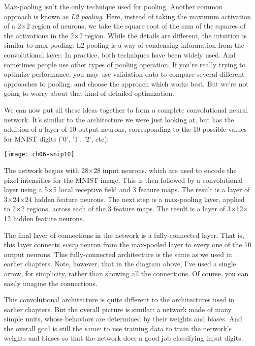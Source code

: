 Max-pooling isn't the only technique used for pooling. Another common approach is known as \textit{L2 pooling}. Here, instead of taking the maximum activation of a 2$\times$2 region of neurons, we take the square root of the sum of the squares of the activations in the 2$\times$2 region. While the details are different, the intuition is similar to max-pooling: L2 pooling is a way of condensing information from the convolutional layer. In practice, both techniques have been widely used. And sometimes people use other types of pooling operation. If you're really trying to optimize performance, you may use validation data to compare several different approaches to pooling, and choose the approach which works best. But we're not going to worry about that kind of detailed optimization.

 We can now put all these ideas together to form a complete convolutional neural network. It's similar to the architecture we were just looking at, but has the addition of a layer of 10 output neurons, corresponding to the 10 possible values for MNIST digits ('0', '1', '2', etc):

\begin{figure*}[tph]
    \texttt{[image: ch06-snip10]}
    \end{figure*}

The network begins with 28$\times$28 input neurons, which are used to encode the pixel intensities for the MNIST image. This is then followed by a convolutional layer using a 5$\times$5 local receptive field and 3 feature maps. The result is a layer of 3$\times$24$\times$24 hidden feature neurons. The next step is a max-pooling layer, applied to 2$\times$2 regions, across each of the 3 feature maps. The result is a layer of 3$\times$12$\times$12 hidden feature neurons.

The final layer of connections in the network is a fully-connected layer. That is, this layer connects \textit{every} neuron from the max-pooled layer to every one of the 10 output neurons. This fully-connected architecture is the same as we used in earlier chapters. Note, however, that in the diagram above, I've used a single arrow, for simplicity, rather than showing all the connections. Of course, you can easily imagine the connections.

This convolutional architecture is quite different to the architectures used in earlier chapters. But the overall picture is similar: a network made of many simple units, whose behaviors are determined by their weights and biases. And the overall goal is still the same: to use training data to train the network's weights and biases so that the network does a good job classifying input digits.

